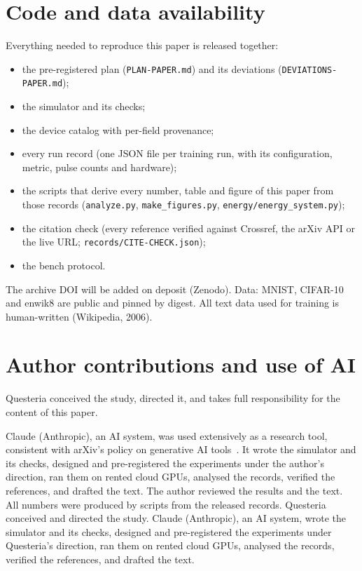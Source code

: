 








\section{Code and data availability}\label{sec:availability}
Everything needed to reproduce this paper is released together:
\begin{itemize}
\item the pre-registered plan (\texttt{PLAN-PAPER.md}) and its deviations (\texttt{DEVIATIONS-PAPER.md});
\item the simulator and its checks;
\item the device catalog with per-field provenance;
\item every run record (one JSON file per training run, with its configuration, metric, pulse counts and hardware);
\item the scripts that derive every number, table and figure of this paper from those records (\texttt{analyze.py},
      \texttt{make\_figures.py}, \texttt{energy/energy\_system.py});
\item the citation check (every reference verified against Crossref, the arXiv API or the live URL;
      \texttt{records/CITE-CHECK.json});
\item the bench protocol.
\end{itemize}
The archive DOI will be added on deposit (Zenodo). Data: MNIST, CIFAR-10 and enwik8 are public and pinned by digest. All text
data used for training is human-written (Wikipedia, 2006).

\section*{Author contributions and use of AI}
\ifdefined\arxivvariant
Questeria conceived the study, directed it, and takes full responsibility for the content of this paper.

Claude (Anthropic), an AI system, was used extensively as a research tool, consistent with arXiv's policy on generative AI
tools~\cite{arxiv_policy}. It wrote the simulator and its checks, designed and pre-registered the experiments under the
author's direction, ran them on rented cloud GPUs, analysed the records, verified the references, and drafted the text. The
author reviewed the results and the text. All numbers were produced by scripts from the released records.
\else
Questeria conceived and directed the study. Claude (Anthropic), an AI system, wrote the simulator and its checks, designed and
pre-registered the experiments under Questeria's direction, ran them on rented cloud GPUs, analysed the records, verified the
references, and drafted the text.

